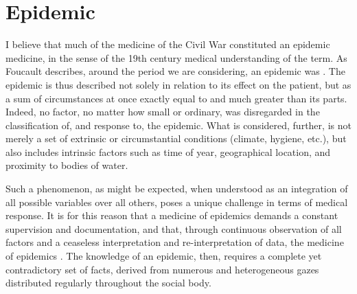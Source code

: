 \documentclass{report}
\begin{document}
  \section{Epidemic}\label{sec:epidemic} %
  I believe that much of the medicine of the Civil War constituted an epidemic medicine, in the sense of the 19th century medical understanding of the term.
  As Foucault describes, around the period we are considering, an epidemic was  \autocite[pp. 23]{Foucault1994}. The epidemic is thus described not solely in relation to its
  effect on the patient, but as a sum of circumstances at once exactly equal to and much greater than its parts. Indeed, no factor,
  no matter how small or ordinary, was disregarded in the classification of, and response to, the epidemic. What is considered, further, is not merely a set
  of extrinsic or circumstantial conditions (climate, hygiene, etc.), but also includes intrinsic factors such as time of year, geographical location,
  and proximity to bodies of water. 

  Such a phenomenon, as might be expected, when understood as an integration of all possible variables over all others, poses a unique challenge in terms of medical
  response. It is for this reason that a medicine of epidemics demands a constant supervision and documentation, and that, through continuous observation
  of all factors and a ceaseless interpretation and re-interpretation of data, the medicine of epidemics  \autocite[pp. 25]{Foucault1994}. The knowledge of an epidemic, then, requires a complete
  yet contradictory set of facts, derived from numerous and heterogeneous gazes distributed regularly throughout the social body. 
\end{document}
